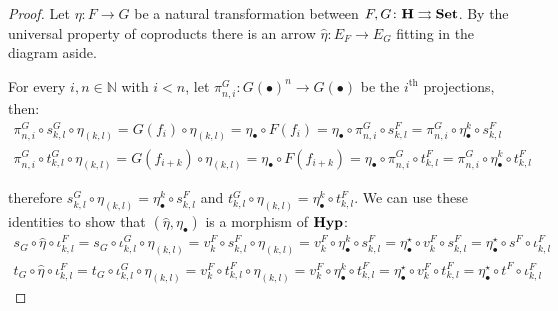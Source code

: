 \documentclass[3p]{elsarticle}
\newcommand{\Set}{\mathbf{Set}}
\def\E{\textbf {\textup{E}}}
\newcommand{\catname}[1]{\textbf{\textup{#1}}}
\newcommand{\hyp}{\catname{Hyp}}
\theoremstyle{remark}
\theoremstyle{definition}
\begin{document}
\begin{proof}\label{proof:equi}
	Let $\eta\colon F\rightarrow G$ be a natural transformation between $F, G\colon \catname{H}\rightrightarrows \Set$.  By the universal property of coproducts there is an arrow $\hat{\eta}\colon E_F\to E_G$ fitting in the diagram aside.
	
	\smallskip 
	\noindent 
	\begin{minipage}[r]{.8\linewidth}
		\setlength{\parindent}{1.5em}
		For every $i, n\in \mathbb{N}$ with $i< n$, let $\pi^G_{n, i}\colon G(\bullet)^n\to G(\bullet)$ be the $i^{\mathrm{th}}$ projections, then:
		\begin{gather*}
			\pi^G_{n, i}\circ s^G_{k,l}\circ \eta_{(k,l)} = G(f_i)\circ \eta_{(k,l)} = \eta_\bullet \circ F(f_i) = \eta_\bullet \circ \pi^G_{n, i} \circ s^F_{k,l} = \pi^G_{n, i}\circ \eta^k_\bullet  \circ s^F_{k,l}\\
			\pi^G_{n, i}\circ t^G_{k,l}\circ \eta_{(k,l)} = G(f_{i+k})\circ \eta_{(k,l)} = \eta_\bullet \circ F(f_{i+k}) = \eta_\bullet \circ \pi^G_{n, i} \circ t^F_{k,l} = \pi^G_{n, i}\circ \eta^k_\bullet \circ  t^F_{k,l}
		\end{gather*}
	\end{minipage}
	\hfill
	\begin{minipage}[l]{.15\linewidth} \vspace{-.5cm}
	\end{minipage}
	\smallskip 
	therefore  $s^G_{k,l}\circ \eta_{(k,l)} =  \eta^k_\bullet  \circ s^F_{k,l}$ and $t^G_{k,l}\circ \eta_{(k,l)} =  \eta^k_\bullet \circ t^F_{k,l}$. We can use these identities to show that $(\hat{\eta}, \eta_{\bullet})$ is a morphism of $\hyp$:
	\begin{gather*}
		s_G\circ \hat{\eta} \circ \iota^F_{k,l}=s_G\circ \iota^G_{k,l}\circ \eta_{(k,l)}=v^F_k\circ s^F_{k,l}\circ \eta_{(k,l)} = v^F_k \circ \eta^k_\bullet  \circ s^F_{k,l} = \eta^\star_\bullet \circ v^F_k\circ s^{F}_{k,l} =\eta^\star_\bullet \circ s^F\circ \iota^F_{k,l}\\
		t_G\circ \hat{\eta} \circ \iota^F_{k,l}=t_G\circ \iota^G_{k,l}\circ \eta_{(k,l)}=v^F_k\circ t^F_{k,l}\circ \eta_{(k,l)} = v^F_k \circ \eta^k_\bullet  \circ t^F_{k,l} = \eta^\star_\bullet \circ v^F_k\circ t^{F}_{k,l} =\eta^\star_\bullet \circ t^F\circ \iota^F_{k,l}
	\end{gather*}
	

\end{proof}
\end{document}
